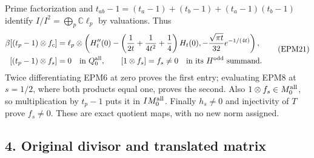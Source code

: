 \documentclass[
  10pt,
  a4paper,
]{article}
\begin{document}
Prime factorization and \(t_{ab}-1=(t_a-1)+(t_b-1)+(t_a-1)(t_b-1)\)
identify \(I/I^2=\bigoplus_p\mathbb C\ell_p\) by valuations. Thus \[
\begin{aligned}
\beta[(t_p-1)\otimes f_c]
&=\ell_p\otimes\left(
H_t''(0)-\left(\frac1{2t}+\frac1{4t^2}+\frac14\right)H_t(0),
-\frac{\sqrt{\pi t}}{32}e^{-1/(4t)}\right),\\
[(t_p-1)\otimes f_s]&=0\quad\text{in }Q_0^{\rm all},\qquad
[1\otimes f_s]=f_s\ne0\quad\text{in its }H^{\rm odd}\text{ summand}.
\end{aligned}\tag{EPM21}
\] Twice differentiating EPM6 at zero proves the first entry; evaluating
EPM8 at \(s=1/2\), where both products equal one, proves the second.
Also \(1\otimes f_s\in M_0^{\rm all}\), so multiplication by \(t_p-1\)
puts it in \(IM_0^{\rm all}\). Finally \(h_s\ne0\) and injectivity of
\(T\) prove \(f_s\ne0\). These are exact quotient maps, with no new norm
assigned.

\subsection{4. Original divisor and translated
matrix}\label{original-divisor-and-translated-matrix}
\end{document}
